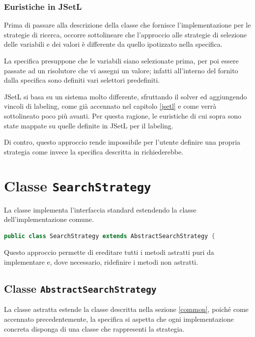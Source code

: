 \subsubsection{Euristiche in JSetL}
Prima di passare alla descrizione della classe  che
fornisce l'implementazione per le strategie di ricerca, occorre sottolineare
che l'approccio alle strategie di selezione delle variabili e dei valori è
differente da quello ipotizzato nella specifica.

La specifica presuppone che le variabili siano selezionate prima, per poi 
essere passate ad un risolutore che vi assegni un valore; infatti 
all'interno del  
 fornito dalla specifica
sono definiti vari selettori predefiniti.

JSetL si basa su un sistema molto differente, sfruttando il solver ed 
aggiungendo vincoli di labeling, come già accennato nel capitolo \ref{jsetl} e 
come verrà sottolineato poco più avanti. Per questa ragione, le euristiche di
cui sopra sono state mappate su quelle definite in JSetL per il labeling.

\begin{notabene}
Di contro, questo approccio rende impossibile per l'utente definire una
propria strategia come invece la specifica descritta in \cite{specifiche} 
richiederebbe. 
\end{notabene}

\section{Classe \texttt{SearchStrategy}}\label{search}
La classe  implementa l'interfaccia standard 
 estendendo la classe  
dell'implementazione comune.
\begin{lstlisting}[language = Java, frame = single]
public class SearchStrategy extends AbstractSearchStrategy {
\end{lstlisting}

Questo approccio permette di ereditare tutti i metodi astratti puri da 
implementare e, dove necessario, ridefinire i metodi non astratti.

\subsection{Classe \texttt{AbstractSearchStrategy}}
La classe astratta  estende la classe
 descritta nella sezione \ref{common}, poiché come
accennato precedentemente, la specifica si aspetta che ogni implementazione
concreta disponga di una classe che rappresenti la strategia.

